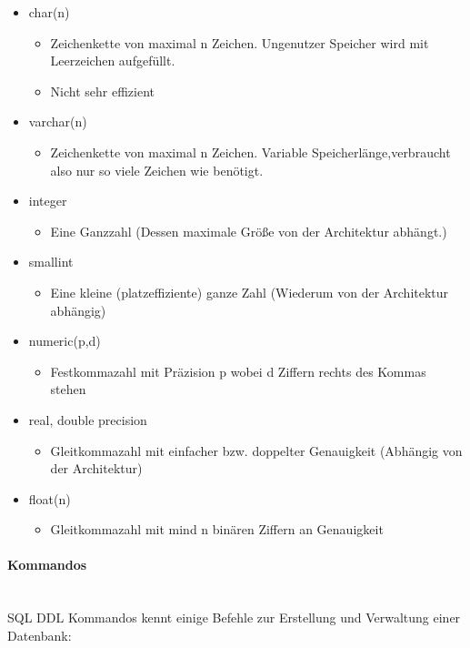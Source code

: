 \documentclass{article}
\newcommand{\paragraphlb}[1]{\paragraph{#1}\mbox{}\\}
\begin{document}
 	\begin{itemize}
 		\item{char(n)}
 		\begin{itemize}
 			\item{Zeichenkette von maximal n Zeichen. Ungenutzer Speicher wird mit Leerzeichen aufgefüllt.}
 			\item{Nicht sehr effizient}
 		\end{itemize}
 		\item{varchar(n)}
 		\begin{itemize}
 			\item{Zeichenkette von maximal n Zeichen. Variable Speicherlänge,verbraucht also nur so viele Zeichen wie benötigt.}
 		\end{itemize}
 		\item{integer}
 		\begin{itemize}
 			\item{Eine Ganzzahl (Dessen maximale Größe von der Architektur abhängt.)}
 		\end{itemize}
 		\item{smallint}
 		\begin{itemize}
 			\item{Eine kleine (platzeffiziente) ganze Zahl (Wiederum von der Architektur abhängig)}
 		\end{itemize}
 		\item{numeric(p,d)}
 		\begin{itemize}
 			\item{Festkommazahl mit Präzision p wobei d Ziffern rechts des Kommas stehen}
 		\end{itemize}
 		\item{real, double precision}
 		\begin{itemize}
 			\item{Gleitkommazahl mit einfacher bzw. doppelter Genauigkeit (Abhängig von der Architektur)}
 		\end{itemize}
 		\item{float(n)}
 		\begin{itemize}
 			\item{Gleitkommazahl mit mind n binären Ziffern an Genauigkeit}
 		\end{itemize}
 	\end{itemize}
 	\paragraphlb{Kommandos}
 	SQL DDL Kommandos kennt einige Befehle zur Erstellung und Verwaltung einer Datenbank:
\end{document}

